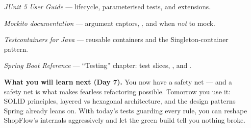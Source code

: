 \begin{wbitem}
  \item \emph{JUnit 5 User Guide} --- lifecycle, parameterised tests, and extensions.
  \item \emph{Mockito documentation} --- argument captors, , and when \emph{not} to mock.
  \item \emph{Testcontainers for Java} --- reusable containers and the Singleton-container pattern.
  \item \emph{Spring Boot Reference} --- ``Testing'' chapter: test slices, , and .
\end{wbitem}

\begin{keyidea}
\textbf{What you will learn next (Day 7).} You now have a safety net --- and a safety net is what makes fearless refactoring possible. Tomorrow you use it: SOLID principles, layered vs hexagonal architecture, and the design patterns Spring already leans on. With today's tests guarding every rule, you can reshape ShopFlow's internals aggressively and let the green build tell you nothing broke.
\end{keyidea}
